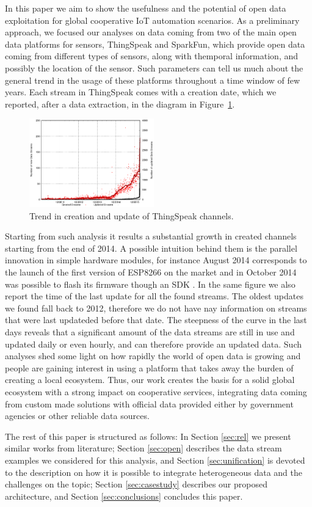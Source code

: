 In this paper we aim to show the usefulness and the potential of open data exploitation for global cooperative IoT automation scenarios.
As a preliminary approach, we focused our analyses on data coming from two of the main open data platforms for sensors, ThingSpeak and SparkFun, which provide open data coming from different types of sensors, along with themporal information, and possibly the location of the sensor.
Such parameters can tell us much about the general trend in the usage of these platforms throughout a time window of few years.
Each stream in ThingSpeak comes with a creation date, which we reported, after a data extraction, in the diagram in Figure~\ref{creationtrend}.
\begin{figure}[btp]
\centering
\includegraphics[width=0.48\textwidth]{img/bars.eps} 
\caption{Trend in creation and update of ThingSpeak channels.}
\label{creationtrend}
\end{figure}
Starting from such analysis it results a substantial growth in created channels starting from the end of 2014. 
A possible intuition behind them is the parallel innovation in simple hardware modules, for instance August 2014 corresponds to the launch of the first version of ESP8266 \cite{esp8266} on the market and in October 2014 was possible to flash its firmware though an SDK \cite{espressif}.
In the same figure we also report the time of the last update for all the found streams.
The oldest updates we found fall back to 2012, therefore we do not have nay information on streams that were last updateded before that date.
The steepness of the curve in the last days reveals that a significant amount of the data streams are still in use and updated daily or even hourly, and can therefore provide an updated data. Such analyses shed some light on how rapidly the world of open data is growing and people are gaining interest in using a platform that takes away the burden of creating a local ecosystem.
Thus, our work creates the basis for a solid global ecosystem with a strong impact on cooperative services, integrating data coming from custom made solutions with official data provided either by government agencies or other reliable data sources. 

The rest of this paper is structured as follows: In Section \ref{sec:rel} we present similar works from literature; Section \ref{sec:open} describes the data stream examples we considered for this analysis, and Section \ref{sec:unification} is devoted to the description on how it is possible to integrate heterogeneous data and the challenges on the topic; Section \ref{sec:casestudy} describes our proposed architecture, and Section \ref{sec:conclusions} concludes this paper.